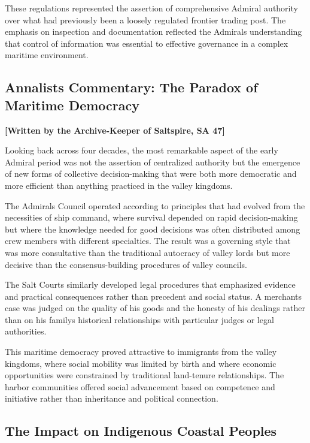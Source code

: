 These regulations represented the assertion of comprehensive Admiral
authority over what had previously been a loosely regulated frontier
trading post. The emphasis on inspection and documentation reflected the
Admirals\textquotesingle{} understanding that control of information was
essential to effective governance in a complex maritime environment.

\subsection{Annalist\textquotesingle s Commentary: The Paradox of
Maritime
Democracy}\label{annalists-commentary-the-paradox-of-maritime-democracy}

\textbf{{[}Written by the Archive-Keeper of Saltspire, SA 47{]}}

Looking back across four decades, the most remarkable aspect of the
early Admiral period was not the assertion of centralized authority but
the emergence of new forms of collective decision-making that were both
more democratic and more efficient than anything practiced in the valley
kingdoms.

The Admiral\textquotesingle s Council operated according to principles
that had evolved from the necessities of ship command, where survival
depended on rapid decision-making but where the knowledge needed for
good decisions was often distributed among crew members with different
specialties. The result was a governing style that was more consultative
than the traditional autocracy of valley lords but more decisive than
the consensus-building procedures of valley councils.

The Salt Courts similarly developed legal procedures that emphasized
evidence and practical consequences rather than precedent and social
status. A merchant\textquotesingle s case was judged on the quality of
his goods and the honesty of his dealings rather than on his
family\textquotesingle s historical relationships with particular judges
or legal authorities.

This maritime democracy proved attractive to immigrants from the valley
kingdoms, where social mobility was limited by birth and where economic
opportunities were constrained by traditional land-tenure relationships.
The harbor communities offered social advancement based on competence
and initiative rather than inheritance and political connection.

\subsection{The Impact on Indigenous Coastal
Peoples}\label{the-impact-on-indigenous-coastal-peoples}

